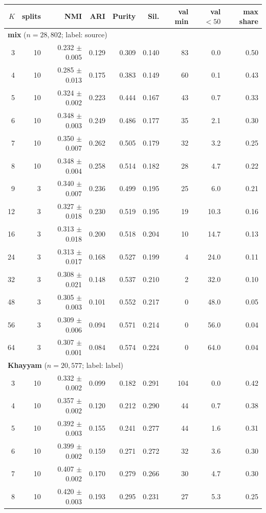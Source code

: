 \begin{longtable}{rrrrrrrrr}
\toprule
$K$ & splits & NMI & ARI & Purity & Sil. & val min & val $<50$ & max share \\
\midrule
\endhead
\multicolumn{9}{l}{\textbf{mix} ($n = 28,802$; label: source)} \\
\midrule
3 & 10 & 0.232 $\pm$ 0.005 & 0.129 & 0.309 & 0.140 & 83 & 0.0 & 0.50 \\
4 & 10 & 0.285 $\pm$ 0.013 & 0.175 & 0.383 & 0.149 & 60 & 0.1 & 0.43 \\
5 & 10 & 0.324 $\pm$ 0.002 & 0.223 & 0.444 & 0.167 & 43 & 0.7 & 0.33 \\
6 & 10 & 0.348 $\pm$ 0.003 & 0.249 & 0.486 & 0.177 & 35 & 2.1 & 0.30 \\
7 & 10 & 0.350 $\pm$ 0.007 & 0.262 & 0.505 & 0.179 & 32 & 3.2 & 0.25 \\
8 & 10 & 0.348 $\pm$ 0.004 & 0.258 & 0.514 & 0.182 & 28 & 4.7 & 0.22 \\
9 & 3 & 0.340 $\pm$ 0.007 & 0.236 & 0.499 & 0.195 & 25 & 6.0 & 0.21 \\
12 & 3 & 0.327 $\pm$ 0.018 & 0.230 & 0.519 & 0.195 & 19 & 10.3 & 0.16 \\
16 & 3 & 0.313 $\pm$ 0.018 & 0.200 & 0.518 & 0.204 & 10 & 14.7 & 0.13 \\
24 & 3 & 0.313 $\pm$ 0.017 & 0.168 & 0.527 & 0.199 & 4 & 24.0 & 0.11 \\
32 & 3 & 0.308 $\pm$ 0.021 & 0.148 & 0.537 & 0.210 & 2 & 32.0 & 0.10 \\
48 & 3 & 0.305 $\pm$ 0.003 & 0.101 & 0.552 & 0.217 & 0 & 48.0 & 0.05 \\
56 & 3 & 0.309 $\pm$ 0.006 & 0.094 & 0.571 & 0.214 & 0 & 56.0 & 0.04 \\
64 & 3 & 0.307 $\pm$ 0.001 & 0.084 & 0.574 & 0.224 & 0 & 64.0 & 0.04 \\
\midrule
\multicolumn{9}{l}{\textbf{Khayyam} ($n = 20,577$; label: label)} \\
\midrule
3 & 10 & 0.332 $\pm$ 0.002 & 0.099 & 0.182 & 0.291 & 104 & 0.0 & 0.42 \\
4 & 10 & 0.357 $\pm$ 0.002 & 0.120 & 0.212 & 0.290 & 44 & 0.7 & 0.38 \\
5 & 10 & 0.392 $\pm$ 0.003 & 0.155 & 0.241 & 0.277 & 44 & 1.6 & 0.31 \\
6 & 10 & 0.399 $\pm$ 0.002 & 0.159 & 0.271 & 0.272 & 32 & 3.6 & 0.30 \\
7 & 10 & 0.407 $\pm$ 0.002 & 0.170 & 0.279 & 0.266 & 30 & 4.7 & 0.30 \\
8 & 10 & 0.420 $\pm$ 0.003 & 0.193 & 0.295 & 0.231 & 27 & 5.3 & 0.25 \\

\end{longtable}
